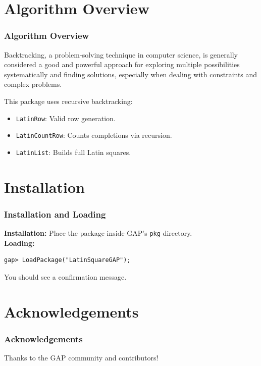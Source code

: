 \documentclass{beamer}
\begin{document}
\section{Algorithm Overview}
\begin{frame}
\frametitle{Algorithm Overview}

Backtracking, a problem-solving technique in computer science, is generally considered a good and powerful approach for exploring multiple possibilities systematically and finding solutions, especially when dealing with constraints and complex problems. 

This package uses recursive backtracking:
\begin{itemize}
  \item \texttt{LatinRow}: Valid row generation.
  \item \texttt{LatinCountRow}: Counts completions via recursion.
  \item \texttt{LatinList}: Builds full Latin squares.
\end{itemize}
\end{frame}

\section{Installation}
\begin{frame}[fragile]
\frametitle{Installation and Loading}
\textbf{Installation:}  
Place the package inside GAP's \texttt{pkg} directory.\\
\textbf{Loading:}
\begin{lstlisting}
gap> LoadPackage("LatinSquareGAP");
\end{lstlisting}
You should see a confirmation message.
\end{frame}


\section{Acknowledgements}
\begin{frame}
\frametitle{Acknowledgements}
Thanks to the GAP community and contributors!
\end{frame}
\end{document}
